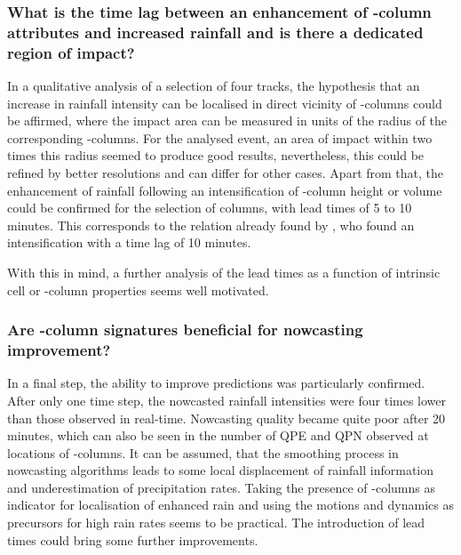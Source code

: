 \subsubsection{What is the time lag between an enhancement of \zdr-column attributes and increased rainfall and is there a dedicated region of impact?}
In a qualitative analysis of a selection of four tracks, the hypothesis that an increase in rainfall intensity can be localised in direct vicinity of \zdr-columns could be affirmed, where the impact area can be measured in units of the radius of the corresponding \zdr-columns. For the analysed event, an area of impact within two times this radius seemed to produce good results, nevertheless, this could be refined by better resolutions and can differ for other cases.
Apart from that, the enhancement of rainfall following an intensification of \zdr-column height or volume could be confirmed for the selection of columns, with lead times of 5 to 10 minutes.
This corresponds to the relation already found by \textcite{adachi2013detection}, who found an intensification with a time lag of 10 minutes. 

With this in mind, a further analysis of the lead times as a function of intrinsic cell or \zdr-column properties seems well motivated.

\subsubsection{Are \zdr-column signatures beneficial for nowcasting improvement?}
In a final step, the ability to improve predictions was particularly confirmed. After only one time step, the nowcasted rainfall intensities were four times lower than those observed in real-time. Nowcasting quality became quite poor after 20 minutes, which can also be seen in the number of QPE and QPN observed at locations of \zdr-columns. It can be assumed, that the smoothing process in nowcasting algorithms leads to some local displacement of rainfall information and underestimation of precipitation rates. Taking the presence of \zdr-columns as indicator for localisation of enhanced rain and using the motions and dynamics as precursors for high rain rates seems to be practical.
The introduction of lead times could bring some further improvements.

\newpage
